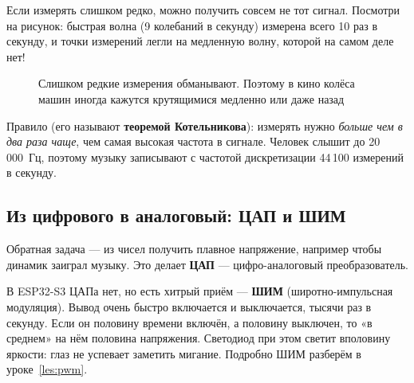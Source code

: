 Если измерять слишком редко, можно получить совсем не тот сигнал. Посмотри на рисунок: быстрая волна
(9 колебаний в секунду) измерена всего 10 раз в секунду, и точки измерений легли на медленную волну,
которой на самом деле нет!

\begin{figure}[H]
\centering
{}
\caption{Слишком редкие измерения обманывают. Поэтому в кино колёса машин иногда
кажутся крутящимися медленно или даже назад}
\end{figure}

Правило (его называют \textbf{теоремой Котельникова}): измерять нужно \emph{больше чем в два раза чаще},
чем самая высокая частота в сигнале. Человек слышит до 20\,000~Гц, поэтому музыку записывают с частотой
дискретизации 44\,100 измерений в секунду.

\subsection{Из цифрового в аналоговый: ЦАП и ШИМ}

Обратная задача --- из чисел получить плавное напряжение, например чтобы динамик заиграл музыку.
Это делает \textbf{ЦАП} --- цифро-аналоговый преобразователь.

В ESP32-S3 ЦАПа нет, но есть хитрый приём --- \textbf{ШИМ} (широтно-импульсная модуляция).
Вывод очень быстро включается и выключается, тысячи раз в секунду. Если он половину времени
включён, а половину выключен, то «в среднем» на нём половина напряжения. Светодиод при этом светит
вполовину яркости: глаз не успевает заметить мигание. Подробно ШИМ разберём в уроке~\ref{les:pwm}.


